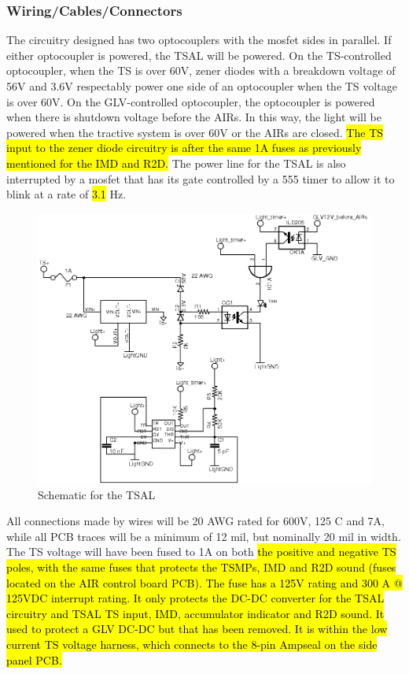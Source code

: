 \documentclass{article}
\DeclareRobustCommand{\hlr}[1]{{\sethlcolor{red}\hl{#1}}}
\begin{document}
        \subsubsection{Wiring/Cables/Connectors}


             The circuitry designed has two optocouplers with the mosfet sides in parallel. If either optocoupler is powered, the TSAL will be powered. On the TS-controlled optocoupler, when the TS is over 60V, zener diodes with a breakdown voltage of 56V and 3.6V respectably power one side of an optocoupler when the TS voltage is over 60V. On the GLV-controlled optocoupler, the optocoupler is powered when there is shutdown voltage before the AIRs. In this way, the light will be powered when the tractive system is over 60V or the AIRs are closed. \hlr{The TS input to the zener diode circuitry is after the same 1A fuses as previously mentioned for the IMD and R2D. } The power line for the TSAL is also interrupted by a mosfet that has its gate controlled by a 555 timer to allow it to blink at a rate of \hlr{3.1} Hz.

            \begin{figure}[H]
            \centering
            \includegraphics[width = 0.7 \textwidth]{TSAL_FSAE}
            \caption{Schematic for the TSAL}
            \label{TSALschem}
            \end{figure}

            All connections made by wires will be 20 AWG rated for 600V, 125 \degree C and 7A, while all PCB traces will be a minimum of 12 mil, but nominally 20 mil in width. The TS voltage will have been fused to 1A on both \hlr{the positive and negative TS poles, with the same fuses that protects the TSMPs, IMD and R2D sound (fuses located on the AIR control board PCB). The fuse has a 125V rating and 300 A @ 125VDC interrupt rating. It only protects the DC-DC converter for the TSAL circuitry and TSAL TS input, IMD, accumulator indicator and R2D sound. It used to protect a GLV DC-DC but that has been removed. It is within the low current TS voltage harness, which connects to the 8-pin Ampseal on the side panel PCB. }
\end{document}
